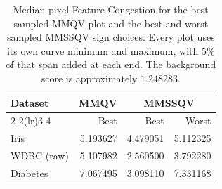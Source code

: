 \begin{table}[ht]
\centering
\caption{Median pixel Feature Congestion for the best sampled MMQV plot and the best and worst sampled MMSSQV sign choices. Every plot uses its own curve minimum and maximum, with $5\%$ of that span added at each end. The background score is approximately $1.248283$.}
\label{tabMedianCongestion}
\begin{tabular}{lrrr}
\toprule
Dataset & MMQV & \multicolumn{2}{c}{MMSSQV} \\
\cmidrule(lr){2-2}\cmidrule(lr){3-4}
 & Best & Best & Worst \\
\midrule
Iris & 5.193627 & 4.479051 & 5.112325 \\
WDBC (raw) & 5.107982 & 2.560500 & 3.792280 \\
Diabetes & 7.067495 & 3.098110 & 7.331168 \\
\bottomrule
\end{tabular}
\end{table}
